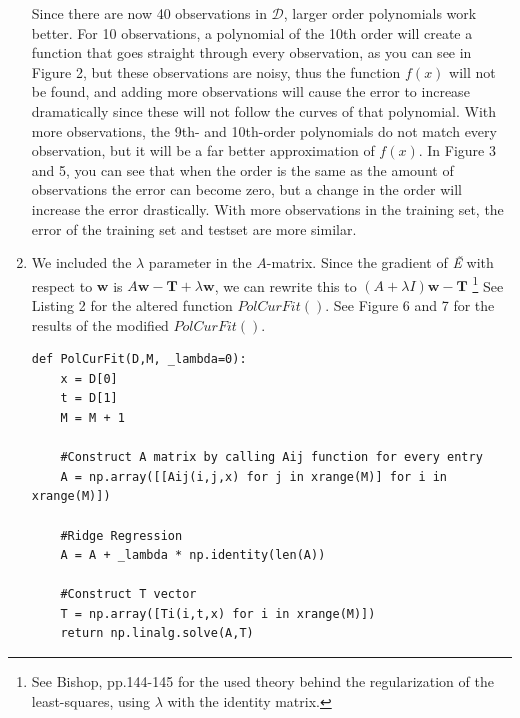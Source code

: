 \documentclass[a4paper,11pt]{article}
\theoremstyle{mytheor}
\begin{document}
\begin{enumerate}
\begin{figure}[h!]
		\end{figure}
		Since there are now 40 observations in $\mathcal{D}$, larger order polynomials work better. For 10 observations, a polynomial of the 10th order will create a function that goes straight through every observation, as you can see in Figure 2, but these observations are noisy, thus the function $f(x)$ will not be found, and adding more observations will cause the error to increase dramatically since these will not follow the curves of that polynomial. With more observations, the 9th- and 10th-order polynomials do not match every observation, but it will be a far better approximation of $f(x)$. In Figure 3 and 5, you can see that when the order is the same as the amount of observations the error can become zero, but a change in the order will increase the error drastically. With more observations in the training set, the error of the training set and testset are more similar. 
	\item We included the $\lambda$ parameter in the $A$-matrix. Since the gradient of \textit{\~{E}} with respect to $\boldsymbol{w}$ is $A\boldsymbol{w}-\boldsymbol{T} + \lambda \boldsymbol{w}$, we can rewrite this to $(A+\lambda I)\boldsymbol{w} - \boldsymbol{T}$ \footnote{See Bishop, pp.144-145 for the used theory behind the regularization of the least-squares, using $\lambda$ with the identity matrix.} See Listing 2 for the altered function $PolCurFit()$. See Figure 6 and 7 for the results of the modified $PolCurFit()$.
		\begin{lstlisting}[label={list:second},caption=Python code for function PolCurFit -- Penalty added.]
def PolCurFit(D,M, _lambda=0):
    x = D[0]
    t = D[1]
    M = M + 1
    
    #Construct A matrix by calling Aij function for every entry
    A = np.array([[Aij(i,j,x) for j in xrange(M)] for i in xrange(M)])
    
    #Ridge Regression
    A = A + _lambda * np.identity(len(A))    
    
    #Construct T vector
    T = np.array([Ti(i,t,x) for i in xrange(M)])
    return np.linalg.solve(A,T)
		\end{lstlisting}


\end{enumerate}
\end{document}
